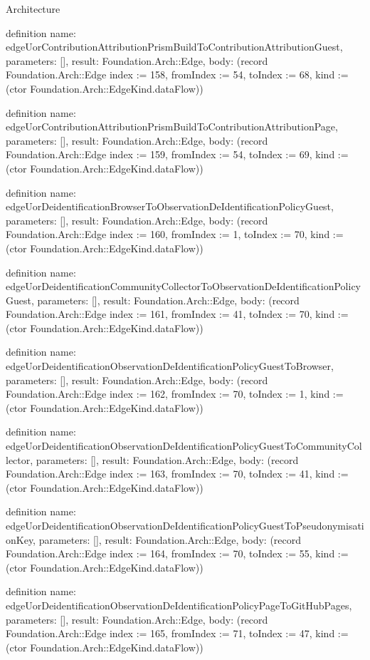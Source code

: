 \begin{lexlean}{Architecture}
\begin{semanticmodule}
definition{
  name: edgeUorContributionAttributionPrismBuildToContributionAttributionGuest,
  parameters: [],
  result: Foundation.Arch::Edge,
  body: (record Foundation.Arch::Edge {index := 158, fromIndex := 54, toIndex := 68, kind := (ctor Foundation.Arch::EdgeKind.dataFlow)})
}

definition{
  name: edgeUorContributionAttributionPrismBuildToContributionAttributionPage,
  parameters: [],
  result: Foundation.Arch::Edge,
  body: (record Foundation.Arch::Edge {index := 159, fromIndex := 54, toIndex := 69, kind := (ctor Foundation.Arch::EdgeKind.dataFlow)})
}

definition{
  name: edgeUorDeidentificationBrowserToObservationDeIdentificationPolicyGuest,
  parameters: [],
  result: Foundation.Arch::Edge,
  body: (record Foundation.Arch::Edge {index := 160, fromIndex := 1, toIndex := 70, kind := (ctor Foundation.Arch::EdgeKind.dataFlow)})
}

definition{
  name: edgeUorDeidentificationCommunityCollectorToObservationDeIdentificationPolicyGuest,
  parameters: [],
  result: Foundation.Arch::Edge,
  body: (record Foundation.Arch::Edge {index := 161, fromIndex := 41, toIndex := 70, kind := (ctor Foundation.Arch::EdgeKind.dataFlow)})
}

definition{
  name: edgeUorDeidentificationObservationDeIdentificationPolicyGuestToBrowser,
  parameters: [],
  result: Foundation.Arch::Edge,
  body: (record Foundation.Arch::Edge {index := 162, fromIndex := 70, toIndex := 1, kind := (ctor Foundation.Arch::EdgeKind.dataFlow)})
}

definition{
  name: edgeUorDeidentificationObservationDeIdentificationPolicyGuestToCommunityCollector,
  parameters: [],
  result: Foundation.Arch::Edge,
  body: (record Foundation.Arch::Edge {index := 163, fromIndex := 70, toIndex := 41, kind := (ctor Foundation.Arch::EdgeKind.dataFlow)})
}

definition{
  name: edgeUorDeidentificationObservationDeIdentificationPolicyGuestToPseudonymisationKey,
  parameters: [],
  result: Foundation.Arch::Edge,
  body: (record Foundation.Arch::Edge {index := 164, fromIndex := 70, toIndex := 55, kind := (ctor Foundation.Arch::EdgeKind.dataFlow)})
}

definition{
  name: edgeUorDeidentificationObservationDeIdentificationPolicyPageToGitHubPages,
  parameters: [],
  result: Foundation.Arch::Edge,
  body: (record Foundation.Arch::Edge {index := 165, fromIndex := 71, toIndex := 47, kind := (ctor Foundation.Arch::EdgeKind.dataFlow)})
}


\end{semanticmodule}
\end{lexlean}
